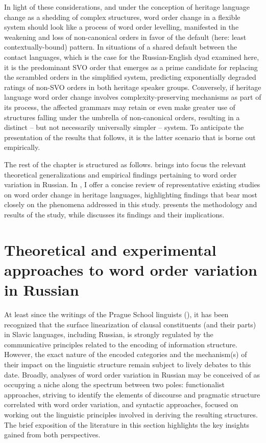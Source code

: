\documentclass[output=paper]{langscibook}
\begin{document}
In light of these considerations, and under the conception of heritage language change as a shedding of complex structures, word order change in a flexible system should look like a process of word order levelling, manifested in the weakening and loss of non-canonical orders in favor of the default (here: least contextually-bound) pattern. In situations of a shared default between the contact languages, which is the case for the Russian-English dyad examined here, it is the predominant SVO order that emerges as a prime candidate for replacing the scrambled orders in the simplified system, predicting exponentially degraded ratings of non-SVO orders in both heritage speaker groups. Conversely, if heritage language word order change involves complexity-preserving mechanisms as part of its process, the affected grammars may retain or even make greater use of structures falling under the umbrella of non-canonical orders, resulting in a distinct – but not necessarily universally simpler – system. To anticipate the presentation of the results that follows, it is the latter scenario that is borne out empirically.

The rest of the chapter is structured as follows.  brings into focus the relevant theoretical generalizations and empirical findings pertaining to word order variation in Russian. In , I offer a concise review of representative existing studies on word order change in heritage languages, highlighting findings that bear most closely on the phenomena addressed in this study.  presents the methodology and results of the study, while  discusses its findings and their implications.

\section{Theoretical and experimental approaches to word order variation in Russian}\label{sec:laleko:2}

At least since the writings of the Prague School linguists (\citealt{Mathesius1947, Firbas1964}), it has been recognized that the surface linearization of clausal constituents (and their parts) in Slavic languages, including Russian, is strongly regulated by the communicative principles related to the encoding of information structure. However, the exact nature of the encoded categories and the mechanism(s) of their impact on the linguistic structure remain subject to lively debates to this date. Broadly, analyses of word order variation in Russian may be conceived of as occupying a niche along the spectrum between two poles: functionalist approaches, striving to identify the elements of discourse and pragmatic structure correlated with word order variation, and syntactic approaches, focused on working out the linguistic principles involved in deriving the resulting structures. The brief exposition of the literature in this section highlights the key insights gained from both perspectives.
\end{document}
